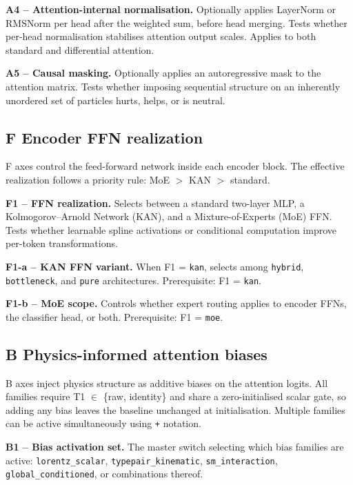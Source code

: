 \textbf{A4 -- Attention-internal normalisation.} Optionally applies
LayerNorm or RMSNorm per head after the weighted sum, before head
merging. Tests whether per-head normalisation stabilises attention
output scales. Applies to both standard and differential attention.

\textbf{A5 -- Causal masking.} Optionally applies an autoregressive
mask to the attention matrix. Tests whether imposing sequential
structure on an inherently unordered set of particles hurts, helps,
or is neutral.

\subsection*{F \quad Encoder FFN realization}

F axes control the feed-forward network inside each encoder block. The
effective realization follows a priority rule: MoE $>$ KAN $>$ standard.

\textbf{F1 -- FFN realization.} Selects between a standard two-layer
MLP, a Kolmogorov--Arnold Network (KAN), and a Mixture-of-Experts (MoE)
FFN. Tests whether learnable spline activations or conditional
computation improve per-token transformations.

\textbf{F1-a -- KAN FFN variant.} When F1 = \texttt{kan}, selects
among \texttt{hybrid}, \texttt{bottleneck}, and \texttt{pure}
architectures. Prerequisite: F1 = \texttt{kan}.

\textbf{F1-b -- MoE scope.} Controls whether expert routing applies
to encoder FFNs, the classifier head, or both. Prerequisite:
F1 = \texttt{moe}.

\subsection*{B \quad Physics-informed attention biases}

B axes inject physics structure as additive biases on the attention
logits. All families require T1 $\in$ \{raw, identity\} and share a
zero-initialised scalar gate, so adding any bias leaves the baseline
unchanged at initialisation. Multiple families can be active
simultaneously using \texttt{+} notation.

\textbf{B1 -- Bias activation set.} The master switch selecting which
bias families are active: \texttt{lorentz\_scalar},
\texttt{typepair\_kinematic}, \texttt{sm\_interaction},
\texttt{global\_conditioned}, or combinations thereof.

